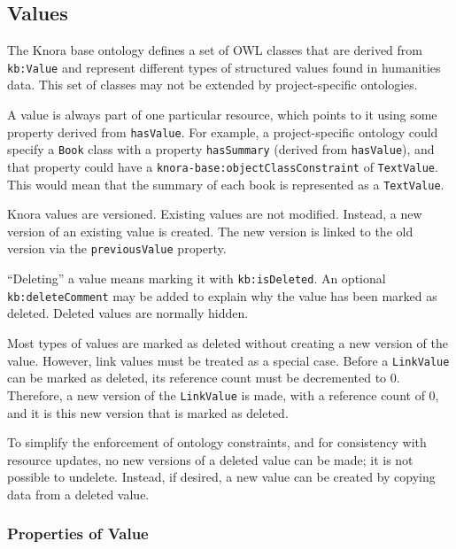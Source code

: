 \documentclass[12pt, a4paper]{article}
\begin{document}
\subsection{Values}

\label{subsec:values}

The Knora base ontology defines a set of OWL classes that are derived from \texttt{kb:Value} and represent different types of structured values found in humanities data. This set of classes may not be extended by project-specific ontologies.

A value is always part of one particular resource, which points to it using some property derived from \texttt{hasValue}. For example, a project-specific ontology could specify a \texttt{Book} class with a property \texttt{hasSummary} (derived from \texttt{hasValue}), and that property could have a \texttt{knora-base:object\-Class\-Constraint} of \texttt{TextValue}. This would mean that the summary of each book is represented as a \texttt{TextValue}.

Knora values are versioned. Existing values are not modified. Instead, a new version of an existing value is created. The new version is linked to the old version via the \texttt{previousValue} property.

\enquote{Deleting} a value means marking it with \texttt{kb:is\-Deleted}. An optional \texttt{kb:delete\-Comment} may be added to explain why the value has been marked as deleted. Deleted values are normally hidden.

Most types of values are marked as deleted without creating a new version of the value. However, link values must be treated as a special case. Before a \texttt{LinkValue} can be marked as deleted, its reference count must be decremented to 0. Therefore, a new version of the \texttt{LinkValue} is made, with a reference count of 0, and it is this new version that is marked as deleted.

To simplify the enforcement of ontology constraints, and for consistency with resource updates, no new versions of a deleted value can be made; it is not possible to undelete. Instead, if desired, a new value can be created by copying data from a deleted value.

\subsubsection{Properties of Value}
\end{document}
